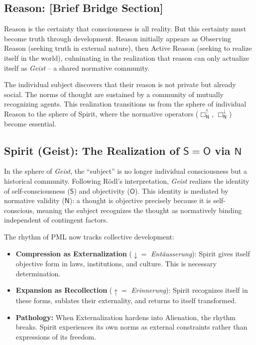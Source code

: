 \documentclass[12pt]{book}
\newcommand{\NBoxUp}{\Box_{\mathsf{N}}^{\uparrow}}
\newcommand{\NBoxDown}{\Box_{\mathsf{N}}^{\downarrow}}
\begin{document}
\subsection{Reason: [Brief Bridge Section]}

Reason is the certainty that consciousness is all reality. But this certainty must become truth through development. Reason initially appears as Observing Reason (seeking truth in external nature), then Active Reason (seeking to realize itself in the world), culminating in the realization that reason can only actualize itself as \textit{Geist} -- a shared normative community.

The individual subject discovers that their reason is not private but already social. The norms of thought are sustained by a community of mutually recognizing agents. This realization transitions us from the sphere of individual Reason to the sphere of Spirit, where the normative operators ($\NBoxUp$, $\NBoxDown$) become essential.

\subsection{Spirit (Geist): The Realization of $\mathsf{S} = \mathsf{O}$ via $\mathsf{N}$}

In the sphere of \textit{Geist}, the ``subject'' is no longer individual consciousness but a historical community. Following Rödl's interpretation, \textit{Geist} realizes the identity of self-consciousness ($\mathsf{S}$) and objectivity ($\mathsf{O}$). This identity is mediated by normative validity ($\mathsf{N}$): a thought is objective precisely because it is self-conscious, meaning the subject recognizes the thought as normatively binding independent of contingent factors.

The rhythm of PML now tracks collective development:
\begin{itemize}
\item \textbf{Compression as Externalization} ($\downarrow = $ \emph{Entäusserung}): Spirit gives itself objective form in laws, institutions, and culture. This is necessary determination.
\item \textbf{Expansion as Recollection} ($\uparrow = $ \emph{Erinnerung}): Spirit recognizes itself in these forms, sublates their externality, and returns to itself transformed.
\item \textbf{Pathology:} When Externalization hardens into Alienation, the rhythm breaks. Spirit experiences its own norms as external constraints rather than expressions of its freedom.
\end{itemize}
\end{document}
